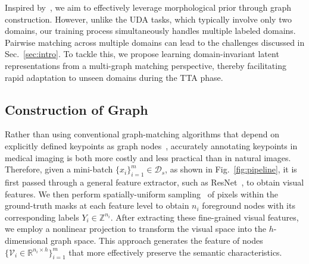 Inspired by~\cite{pmlr-v235-pu24b}, we aim to effectively leverage morphological prior through graph construction. However, unlike the UDA tasks, which typically involve only two domains, our training process simultaneously handles multiple labeled domains. Pairwise matching across multiple domains can lead to the challenges discussed in Sec.~\ref{sec:intro}. To tackle this, we propose learning domain-invariant latent representations from a multi-graph matching perspective, thereby facilitating rapid adaptation to unseen domains during the TTA phase.


\subsection{Construction of Graph}
\label{sec:graph_generation}

Rather than using conventional graph-matching algorithms that depend on explicitly defined keypoints as graph nodes~\cite{gao2021deep,wang2019learning,wang2021neural}, accurately annotating keypoints in medical imaging is both more costly and less practical than in natural images.
Therefore, given a mini-batch $\{x_i\}_{i=1}^{m} \in \mathcal{D}_s$, as shown in Fig.~\ref{fig:pipeline}, it is first passed through a general feature extractor, such as ResNet~\cite{he2016deep}, to obtain visual features.
We then perform spatially-uniform sampling~\cite{li2022sigma} of pixels within the ground-truth masks at each feature level to obtain $n_i$ foreground nodes with its corresponding labels ${Y}_i\in \mathbb{Z}^{n_i}$.
After extracting these fine-grained visual features, we employ a nonlinear projection to transform the visual space into the $h$-dimensional graph space. This approach generates the feature of nodes $\{\mathcal{V}_i\in \mathbb{R}^{n_i \times h}\}_{i=1}^m$ that more effectively preserve the semantic characteristics. 

